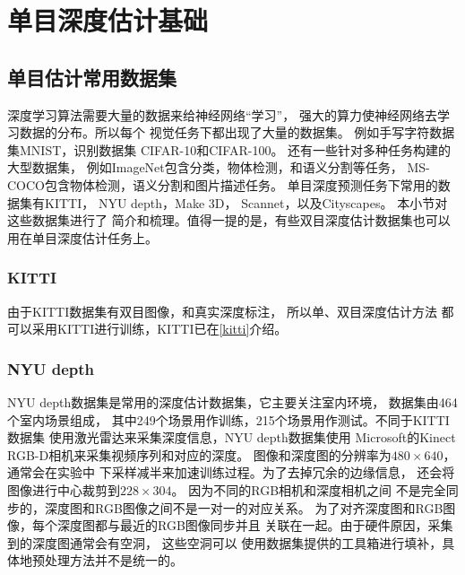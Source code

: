 %
%
\section{单目深度估计基础}

\subsection{单目估计常用数据集}
深度学习算法需要大量的数据来给神经网络“学习”，
强大的算力使神经网络去学习数据的分布。所以每个
视觉任务下都出现了大量的数据集。
例如手写字符数据集MNIST\cite{lecun2010mnist}，识别数据集
CIFAR-10\cite{Krizhevsky}和CIFAR-100\cite{Krizhevsky}。
还有一些针对多种任务构建的大型数据集，
例如ImageNet\cite{imagenet}包含分类，物体检测，和语义分割等任务，
MS-COCO\cite{coco}包含物体检测，语义分割和图片描述任务。
单目深度预测任务下常用的数据集有KITTI\cite{kitti}，
NYU depth\cite{nyu}，Make 3D\cite{Make3D}，
Scannet\cite{scannet}，以及Cityscapes\cite{cityscapes}。
本小节对这些数据集进行了
简介和梳理。值得一提的是，有些双目深度估计数据集也可以用在单目深度估计任务上。

\subsubsection{KITTI}
由于KITTI数据集有双目图像，和真实深度标注，
所以单、双目深度估计方法
都可以采用KITTI进行训练，KITTI已在\ref{kitti}介绍。

\subsubsection{NYU depth}
NYU depth数据集是常用的深度估计数据集，它主要关注室内环境，
数据集由464个室内场景组成，
其中249个场景用作训练，215个场景用作测试。不同于KITTI数据集
使用激光雷达来采集深度信息，NYU depth数据集使用
Microsoft的Kinect RGB-D相机来采集视频序列和对应的深度。
图像和深度图的分辨率为$480 \times 640$，通常会在实验中
下采样减半来加速训练过程。为了去掉冗余的边缘信息，
还会将图像进行中心裁剪到$228 \times 304$。
因为不同的RGB相机和深度相机之间
不是完全同步的，深度图和RGB图像之间不是一对一的对应关系。
为了对齐深度图和RGB图像，每个深度图都与最近的RGB图像同步并且
关联在一起。由于硬件原因，采集到的深度图通常会有空洞，
这些空洞可以
使用数据集提供的工具箱进行填补，具体地预处理方法并不是统一的。
